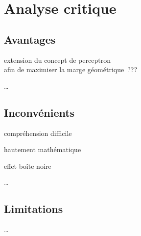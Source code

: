 \section{Analyse critique}

\subsection{Avantages}

\begin{itmz}
\item{extension du concept de perceptron\\
afin de maximiser la marge géométrique ???}
\end{itmz}

…

\subsection{Inconvénients}

\begin{itmz}
\item{compréhension difficile}
\item{hautement mathématique}
\item{effet boîte noire}
\end{itmz}

…

\subsection{Limitations}

…

\pagebreak
